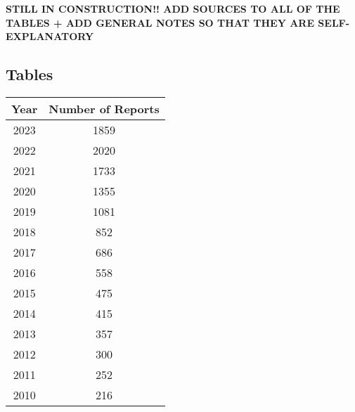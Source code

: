 \documentclass[12pt]{article}
\begin{document}
\textbf{STILL IN CONSTRUCTION!! ADD SOURCES TO ALL OF THE TABLES + ADD GENERAL NOTES SO THAT THEY ARE SELF-EXPLANATORY}

\subsection{Tables}\label{app:data:tabs}
\small
\centering

\begin{table}[h]
    \label{tab:sust_reps}
    \centering
        \begin{tabular}{cc}
            \toprule
            Year & Number of Reports\\
            \midrule
            2023 & 1859\\
            2022 & 2020\\
            2021 & 1733\\
            2020 & 1355\\
            2019 & 1081\\
            2018 & 852\\
            2017 & 686\\
            2016 & 558\\
            2015 & 475\\
            2014 & 415\\
            2013 & 357\\
            2012 & 300\\
            2011 & 252\\
            2010 & 216\\
            \bottomrule
        \end{tabular}
\end{table}

\pagebreak
\end{document}
